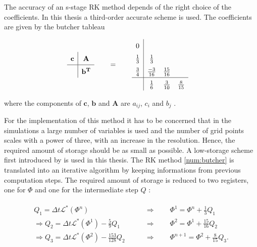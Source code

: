 The accuracy of an s-stage RK method depends of the right choice of the coefficients.
In this thesis a third-order accurate scheme is used.
The coefficients are given by the butcher tableau

\begin{align}
    \label{num:butcher}
    \def\arraystretch{1.5}%
    \begin{array}{c|c}
        \mathbf{c} & \mathbf{A}\\
        \hline     & \mathbf{b^T} \\
    \end{array}
    \qquad &= \qquad
    \def\arraystretch{1.5}%
    \begin{array}{c|ccc}
            0 \\
                    \frac{1}{3} & \frac{1}{3} \\
            \frac{3}{4} & \frac{-3}{16} & \frac{15}{16} \\
            \hline & \frac{1}{6} & \frac{3}{10} & \frac{8}{15}
    \end{array}
\end{align}

where the components of $\mathbf{c}$, $\mathbf{b}$ and $\mathbf{A}$ are $a_{ij}$, $c_i$ and $b_j$ \citep{umwelt}.

For the implementation of this method it has to be concerned that in the simulations a large number of variables is used
and the number of grid points scales with a power of three, with an increase in the resolution.
Hence, the required amount of storage should be as small as possible.
A low-storage scheme first introduced by \citep{Williamson1980} is used in this thesis.
The RK method \ref{num:butcher} is translated into an iterative algorithm by keeping informations from previous computation steps.
The required amount of storage is reduced to two registers, one for $\Phi$ and one for the intermediate step $Q$  \citep{umwelt}:

\begin{align}
    \begin{split}
    Q_1 = \Delta t \mathcal{L}^*\left(\Phi^n\right)\qquad &\Rightarrow \qquad \Phi^{1} = \Phi^n + \frac{1}{3}Q_1 \\
    \Rightarrow Q_2 = \Delta t \mathcal{L}^*\left(\Phi^1\right) - \frac{5}{9} Q_1 \qquad &\Rightarrow \qquad \Phi^{2} = \Phi^1 + \frac{15}{16}Q_2 \\
   \Rightarrow  Q_3 = \Delta t \mathcal{L}^*\left(\Phi^2\right) - \frac{153}{128} Q_2 \qquad &\Rightarrow \qquad \Phi^{n+1} = \Phi^2 + \frac{8}{15}Q_3. \\
    \end{split}
\end{align}


